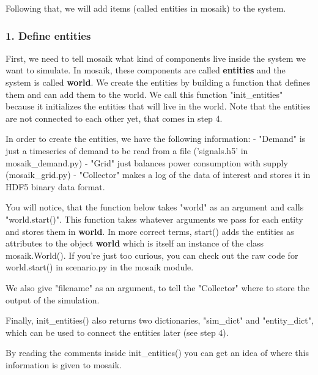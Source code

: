 \documentclass[11pt]{article}
\begin{document}
Following that, we will add items (called entities in mosaik) to the
system.

    \subsubsection{1. Define entities}\label{define-entities}

First, we need to tell mosaik what kind of components live inside the
system we want to simulate. In mosaik, these components are called
\textbf{entities} and the system is called \textbf{world}. We create the
entities by building a function that defines them and can add them to
the world. We call this function "init\_entities" because it initializes
the entities that will live in the world. Note that the entities are not
connected to each other yet, that comes in step 4.

In order to create the entities, we have the following information: -
"Demand" is just a timeseries of demand to be read from a file
('signals.h5' in mosaik\_demand.py) - "Grid" just balances power
consumption with supply (mosaik\_grid.py) - "Collector" makes a log of
the data of interest and stores it in HDF5 binary data format.

You will notice, that the function below takes "world" as an argument
and calls "world.start()". This function takes whatever arguments we
pass for each entity and stores them in \textbf{world}. In more correct
terms, start() adds the entities as attributes to the object
\textbf{world} which is itself an instance of the class mosaik.World().
If you're just too curious, you can check out the raw code for
world.start() in scenario.py in the mosaik module.

We also give "filename" as an argument, to tell the "Collector" where to
store the output of the simulation.

Finally, init\_entities() also returns two dictionaries, "sim\_dict" and
"entity\_dict", which can be used to connect the entities later (see
step 4).

By reading the comments inside init\_entities() you can get an idea of
where this information is given to mosaik.
\end{document}
